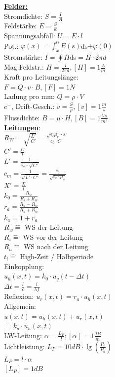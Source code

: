 \documentclass[8pt]{extarticle}
\begin{document}
\begin{minipage}{0.33\textwidth}

\underline{\textbf{Felder:}}\\
Stromdichte: $S=\frac{I}{A}$\\
Feldstärke: $E=\frac{S}{\kappa}$\\
Spannungsabfall: $U=E \cdot l$\\
Pot.: $\varphi (x)= \int_x^0 E(s)$ds$ + \varphi(0)$\\
Stromstärke: $I = \oint H $ds$ = H \cdot 2\pi d$\\
Mag.Feldstr.: $H = \frac{I}{2\pi d}, [H] = 1\frac{A}{m}$\\
Kraft pro Leitungslänge:\\
\phantom{ss} $F=Q \cdot v \cdot B, [F] = 1N$\\
Ladung pro mm: $Q = \rho \cdot V$\\
$e^-$, Drift-Gesch.: $v = \frac{S}{\rho}, [v] = 1\frac{m}{s}$\\
Flussdichte: $B=\mu \cdot H, [B] = 1 \frac{Vs}{m^2}$\\
 
\underline{\textbf{Leitungen}}:\\
$R_W = \sqrt{\frac{L'}{C'}} = \frac{\sqrt{\epsilon_r \mu_r} \cdot s}{c_0 \cdot C}$ \\
$C' = \frac{C}{l}$\\
$L' = \frac{1}{c_m \cdot \sqrt{C'}}$\\
$c_m= \frac{1}{\sqrt{L' \cdot C'}} = \frac{c_0}{\sqrt{\epsilon_r \cdot \mu_s}}$\\
$X' = \frac{X}{l}$\\

$k_0 = \frac{R_w}{R_i + R_w} $\\
$r_a = \frac{R_a - R_w}{R_a + R_w} $\\
$k_a = 1 + r_a$\\
$R_w \hat{=}$ WS der Leitung\\
$R_i \hat{=}$ WS vor der Leitung\\
$R_a \hat{=}$ WS nach der Leitung\\
$t_i \hat{=}$ High-Zeit / Halbperiode\\
Einkopplung:\\
\phantom{ss} $u_h(x,t)= k_0 \cdot u_{q}(t-\Delta t)$\\
\phantom{sss}$\Delta t = \frac{l}{c} = \frac{l}{\lambda f}$\\
Reflexion: $u_r(x,t) = r_a \cdot u_h(x,t)$\\
Allgemein:\\
\phantom{ss} $u(x,t) = u_h(x,t) + u_r(x,t)$\\
\phantom{sssssssiss} $= k_a \cdot u_h(x,t)$\\

LW-Leitung: $\alpha = \frac{L_P}{l}; [\alpha] = 1 \frac{dB}{m}$\\
Lichtleistung: $L_P = 10dB \cdot \lg (\frac{P_e}{P_a})$\\
\phantom{sssssississsssss} $L_P = l \cdot \alpha$\\
\phantom{sssssississsssss}$ [L_P] = 1dB$\\



\end{minipage}%
\end{document}
